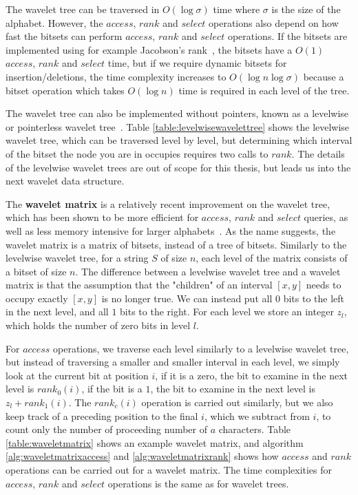 The wavelet tree can be traversed in $O(\log \sigma)$ time where $\sigma$ is the size of
the alphabet. However, the $access$, $rank$ and $select$ operations also depend on how
fast the bitsets can perform $access$, $rank$ and $select$ operations. If the bitsets are
implemented using for example Jacobson's rank~\cite{JacobsonsRank}, the bitsets have a
$O(1)$ $access$, $rank$ and $select$ time, but if we require dynamic bitsets for
insertion/deletions, the time complexity increases to $O(\log n \log \sigma)$ because a
bitset operation which takes $O(\log n)$ time is required in each level of the tree.

The wavelet tree can also be implemented without pointers, known as a levelwise or
pointerless wavelet tree~\cite{LevelwiseWaveletTree}. Table \ref{table:levelwisewavelettree}
shows the levelwise wavelet tree, which can be traversed level by level, but determining
which interval of the bitset the node you are in occupies requires two calls to $rank$.
The details of the levelwise wavelet trees are out of scope for this thesis, but leads us
into the next wavelet data structure.

The \textbf{wavelet matrix} is a relatively recent improvement on the wavelet tree, which
has been shown to be more efficient for $access$, $rank$ and $select$ queries, as well as
less memory intensive for larger alphabets~\cite{WaveletMatrix}. As the name suggests, the
wavelet matrix is a matrix of bitsets, instead of a tree of bitsets. Similarly to the
levelwise wavelet tree, for a string $S$ of size $n$, each level of the matrix consists of
a bitset of size $n$. The difference between a levelwise wavelet tree and a wavelet matrix
is that the assumption that the "children" of an interval $[x, y]$ needs to occupy exactly
$[x, y]$ is no longer true. We can instead put all $0$ bits to the left in the next level,
and all $1$ bits to the right. For each level we store an integer $z_l$, which holds the
number of zero bits in level $l$. 

For $access$ operations, we traverse each level similarly to a levelwise wavelet tree, but
instead of traversing a smaller and smaller interval in each level, we simply look at the
current bit at position $i$, if it is a zero, the bit to examine in the next level is
$rank_0(i)$, if the bit is a $1$, the bit to examine in the next level is $z_l +
rank_1(i)$. The $rank_c(i)$ operation is carried out similarly, but we also keep track of
a preceding position to the final $i$, which we subtract from $i$, to count only the
number of proceeding number of $a$ characters. Table \ref{table:waveletmatrix} shows an
example wavelet matrix, and algorithm \ref{alg:waveletmatrixaccess} and
\ref{alg:waveletmatrixrank} shows how $access$ and $rank$ operations can be carried out
for a wavelet matrix. The time complexities for $access$, $rank$ and $select$ operations
is the same as for wavelet trees.

